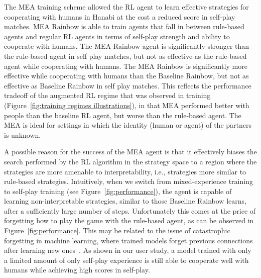 \documentclass[letterpaper]{article} %
\begin{document}


The MEA training scheme allowed the RL agent to learn effective strategies for cooperating with humans in Hanabi at the cost a reduced score in self-play matches. MEA Rainbow is able to train agents that fall in between rule-based agents and regular RL agents in terms of self-play strength and ability to cooperate with humans. The MEA Rainbow agent is significantly stronger than the rule-based agent in self play matches, but not as effective as the rule-based agent while cooperating with humans. The MEA Rainbow is significantly more effective while cooperating with humans than the Baseline Rainbow, but not as effective as Baseline Rainbow in self play matches. 
This reflects   the  performance tradeoff  of the augmented RL regime that was observed in training (Figure~\ref{fig:training regimes illustrations}),  in that   MEA   performed better with people than the baseline RL agent, but worse than the rule-based agent. 
The MEA is ideal for settings in which the identity (human or agent) of the partners is unknown.

A possible reason for the success of the MEA agent is that it  effectively biases the search performed by the RL algorithm in the strategy space to a region where the strategies are more amenable to interpretability, i.e., strategies more similar to rule-based strategies. Intuitively, when we switch from mixed-experience training to self-play training (see Figure~\ref{fig:performance}), the agent is capable of learning non-interpretable strategies, similar to those Baseline Rainbow learns, after a sufficiently large number of steps. Unfortunately this comes at the price of forgetting how to play the game with the rule-based agent, as can be observed in Figure~\ref{fig:performance}. This may be  related to the issue of catastrophic forgetting in machine learning, where trained models forget previous connections after learning new ones~\cite{mccloskey:catastrophic}. As shown in our user study, a model trained with only a limited amount of only self-play experience is still able to cooperate well with humans while achieving high scores in self-play.
\end{document}
